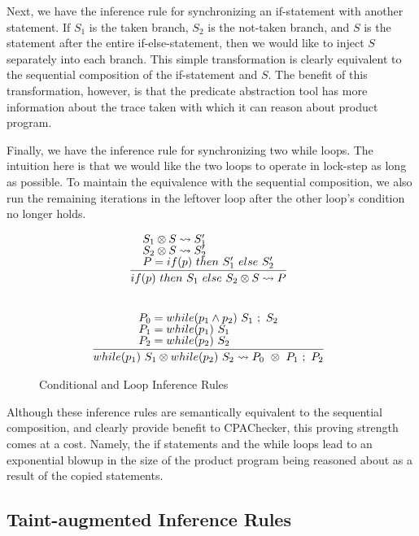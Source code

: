 \documentclass[letterpaper,twocolumn,10pt]{article}
\newcommand{\cross}{\otimes{}}
\begin{document}
Next, we have the inference rule for synchronizing an if-statement with another statement. If $S_1$ is the taken branch, $S_2$ is the not-taken branch, and $S$ is the statement after the entire if-else-statement, then we would like to inject $S$ separately into each branch. This simple transformation is clearly equivalent to the sequential composition of the if-statement and $S$. The benefit of this transformation, however, is that the predicate abstraction tool has more information about the trace taken with which it can reason about product program. 

Finally, we have the inference rule for synchronizing two while loops. The intuition here is that we would like the two loops to operate in lock-step as long as possible. To maintain the equivalence with the sequential composition, we also run the remaining iterations in the leftover loop after the other loop's condition no longer holds.

\begin{figure}
    \label{fig:infrules2}
    \caption{Conditional and Loop Inference Rules}
    \[
		\begin{array}{c}
			\infer[]{if(p)\ then\ S_1\ else\ S_2 \cross S \leadsto P}{
				\text{$S_1 \cross S \leadsto S_1'$} \\
				\text{$S_2 \cross S \leadsto S_2'$} \\
				\text{$P = if(p)\ then\ S_1'\ else\ S_2'$}
			} \\ \\ \\
			\infer[]{while(p_1)\ S_1 \cross while(p_2)\ S_2 \leadsto P_0\ \cross\ P_1\ ;\ P_2}{
				\text{$P_0 = while(p_1 \land p_2)\ S_1\ ;\ S_2$} \\
				\text{$P_1 = while(p_1)\ S_1$} \\
				\text{$P_2 = while(p_2)\ S_2$}
			}
        \end{array}
    \]
\end{figure}

Although these inference rules are semantically equivalent to the sequential composition, and clearly provide benefit to CPAChecker, this proving strength comes at a cost. Namely, the if statements and the while loops lead to an exponential blowup in the size of the product program being reasoned about as a result of the copied statements. 

\subsection{Taint-augmented Inference Rules}
\end{document}
